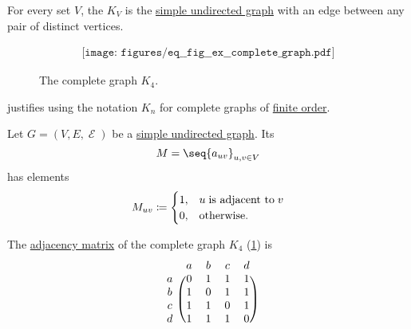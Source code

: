 \begin{example}\label{ex:complete_graph}
  For every set \( V \), the  \( K_V \) is the \hyperref[def:undirected_graph]{simple undirected graph} with an edge between any pair of distinct vertices.

  \begin{figure}
    \begin{equation}\label{eq:fig:ex:complete_graph}
      \begin{aligned}
        \texttt{[image: figures/eq\_\_fig\_\_ex\_\_complete\_graph.pdf]}
      \end{aligned}
    \end{equation}
    \caption{The complete graph \( K_4 \).}\label{fig:ex:complete_graph}
  \end{figure}

   justifies using the notation \( K_n \) for complete graphs of \hyperref[def:hypergraph/order]{finite order}.
\end{example}

\begin{definition}\label{def:graph_adjacency_matrix}
  Let \( G = (V, E, \mscrE) \) be a \hyperref[def:undirected_graph]{simple undirected graph}. Its 
  \begin{equation*}
    M = \seq{ a_{uv} }_{u, v \in V}
  \end{equation*}
  has elements
  \begin{equation*}
    M_{uv} \coloneqq \begin{cases}
      1, &u \T{is adjacent to} v \\
      0, &\T{otherwise.}
    \end{cases}
  \end{equation*}
\end{definition}

\begin{example}\label{ex:def:graph_adjacency_matrix}
  The \hyperref[def:graph_adjacency_matrix]{adjacency matrix} of the complete graph \( K_4 \) (\cref{fig:ex:complete_graph}) is
  \begin{equation}\label{eq:ex:def:graph_adjacency_matrix}
    \begin{blockarray}{ccccc}
        & a & b & c & d \\
    \begin{block}{c(cccc)}
      a & 0 & 1 & 1 & 1 \\
      b & 1 & 0 & 1 & 1 \\
      c & 1 & 1 & 0 & 1 \\
      d & 1 & 1 & 1 & 0 \\
    \end{block}
    \end{blockarray}
  \end{equation}
\end{example}

